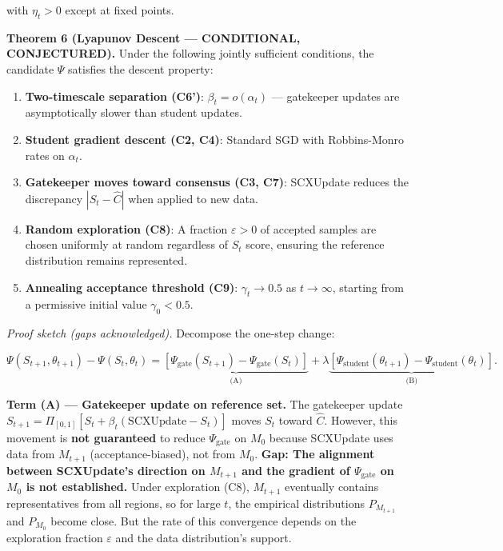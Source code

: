 \documentclass[
  12pt,
]{ctexart}
\providecommand{\tightlist}{%
  \setlength{\itemsep}{0pt}\setlength{\parskip}{0pt}}
\begin{document}
with \(\eta_t > 0\) except at fixed points.

\textbf{Theorem 6 (Lyapunov Descent --- CONDITIONAL, CONJECTURED).}
Under the following jointly sufficient conditions, the candidate
\(\Psi\) satisfies the descent property:

\begin{enumerate}
\def\labelenumi{\arabic{enumi}.}
\tightlist
\item
  \textbf{Two-timescale separation (C6')}: \(\beta_t = o(\alpha_t)\) ---
  gatekeeper updates are asymptotically slower than student updates.
\item
  \textbf{Student gradient descent (C2, C4)}: Standard SGD with
  Robbins-Monro rates on \(\alpha_t\).
\item
  \textbf{Gatekeeper moves toward consensus (C3, C7)}: SCXUpdate reduces
  the discrepancy \(|S_t - \hat{C}|\) when applied to new data.
\item
  \textbf{Random exploration (C8)}: A fraction \(\varepsilon > 0\) of
  accepted samples are chosen uniformly at random regardless of \(S_t\)
  score, ensuring the reference distribution remains represented.
\item
  \textbf{Annealing acceptance threshold (C9)}: \(\gamma_t \to 0.5\) as
  \(t \to \infty\), starting from a permissive initial value
  \(\gamma_0 < 0.5\).
\end{enumerate}

\emph{Proof sketch (gaps acknowledged).} Decompose the one-step change:

\[\Psi(S_{t+1}, \theta_{t+1}) - \Psi(S_t, \theta_t) = \underbrace{[\Psi_{\text{gate}}(S_{t+1}) - \Psi_{\text{gate}}(S_t)]}_{\text{(A)}} + \lambda \underbrace{[\Psi_{\text{student}}(\theta_{t+1}) - \Psi_{\text{student}}(\theta_t)]}_{\text{(B)}}.\]

\textbf{Term (A) --- Gatekeeper update on reference set.} The gatekeeper
update \(S_{t+1} = \Pi_{[0,1]}[S_t + \beta_t(\text{SCXUpdate} - S_t)]\)
moves \(S_t\) toward \(\hat{C}\). However, this movement is \textbf{not
guaranteed} to reduce \(\Psi_{\text{gate}}\) on \(M_0\) because
SCXUpdate uses data from \(M_{t+1}\) (acceptance-biased), not from
\(M_0\). \textbf{Gap: The alignment between SCXUpdate's direction on
\(M_{t+1}\) and the gradient of \(\Psi_{\text{gate}}\) on \(M_0\) is not
established.} Under exploration (C8), \(M_{t+1}\) eventually contains
representatives from all regions, so for large \(t\), the empirical
distributions \(P_{M_{t+1}}\) and \(P_{M_0}\) become close. But the rate
of this convergence depends on the exploration fraction \(\varepsilon\)
and the data distribution's support.
\end{document}
